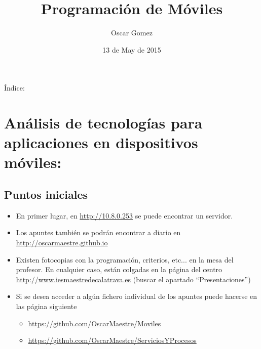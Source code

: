 \documentclass[a4paper,12pt,spanish]{sphinxmanual}
\title{Programación de Móviles}
\date{13 de May de 2015}
\author{Oscar Gomez}
\begin{document}
\maketitle
\tableofcontents
{}\label{index::doc}


Índice:


\chapter{Análisis de tecnologías para aplicaciones en dispositivos móviles:}
\label{tema1:analisis-de-tecnologias-para-aplicaciones-en-dispositivos-moviles}\label{tema1:prog-multimedia-y-de-dispositivos-moviles}\label{tema1::doc}

\section{Puntos iniciales}
\label{tema1:puntos-iniciales}\begin{itemize}
\item {} 
En primer lugar, en \href{http://10.8.0.253}{http://10.8.0.253} se puede encontrar un servidor.

\item {} 
Los apuntes también se podrán encontrar a diario en \href{http://oscarmaestre.github.io}{http://oscarmaestre.github.io}

\item {} 
Existen fotocopias con la programación, criterios, etc... en la mesa del profesor. En cualquier caso, están colgadas en la página del centro \href{http://www.iesmaestredecalatrava.es}{http://www.iesmaestredecalatrava.es} (buscar el apartado ``Presentaciones'')

\item {} 
Si se desea acceder a algún fichero individual de los apuntes puede hacerse en las página siguiente
\begin{itemize}
\item {} 
\href{https://github.com/OscarMaestre/Moviles}{https://github.com/OscarMaestre/Moviles}

\item {} 
\href{https://github.com/OscarMaestre/ServiciosYProcesos}{https://github.com/OscarMaestre/ServiciosYProcesos}

\end{itemize}

\end{itemize}
\end{document}
